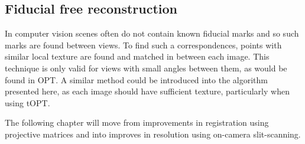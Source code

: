 \subsection{Fiducial free reconstruction}

In computer vision scenes often do not contain known fiducial marks and so such marks are found between views.
To find such a correspondences, points with similar local texture are found and matched in between each image. %
This technique is only valid for views with small angles between them, as would be found in \gls{OPT}.
A similar method could be introduced into the algorithm presented here, as each image should have sufficient texture, particularly when using \gls{tOPT}.

The following chapter will move from improvements in registration using projective matrices and into improves in resolution using on-camera slit-scanning.

